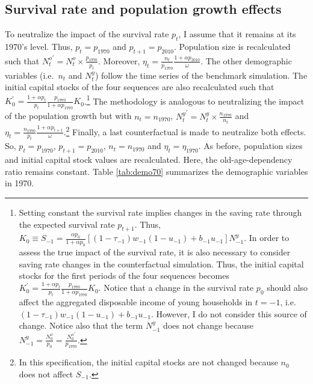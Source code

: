 \documentclass[
]{article}
\begin{document}
\hypertarget{srpg}{%
\subsection{Survival rate and population growth effects}\label{srpg}}

To neutralize the impact of the survival rate \(p_t\), I assume that it remains at its 1970's level. Thus, \(p_t = p_{1970}\) and \(p_{t+1} = p_{2010}\). Population size is recalculated such that \({N^o_t}^\prime = N_t^o\times\frac{p_{1970}}{p_t}\). Moreover, \(\eta_t = \frac{n_t}{p_{1970}}\frac{1+\alpha p_{2010}}{\omega}\).
The other demographic variables (i.e.~\(n_t\) and \(N^y_t\)) follow the time series of the benchmark simulation. The initial capital stocks of the four sequences are also recalculated such that \(K_0^\prime = \frac{1+\alpha p_t}{p_t}\frac{p_{1970}}{1+\alpha p_{1970}} K_0\).\footnote{Setting constant the survival rate implies changes in the saving rate through the expected survival rate \(p_{t+1}\). Thus, \(K_0 \equiv S_{-1} = \frac{\alpha p_0}{1+\alpha p_0}\left[(1-\tau_{-1})w_{-1}(1-u_{-1})+b_{-1}u_{-1}\right]N_{-1}^y\). In order to assess the true impact of the survival rate, it is also necessary to consider saving rate changes in the counterfactual simulation. Thus, the initial capital stocks for the first periods of the four sequences becomes \(K_0^\prime = \frac{1+\alpha p_t}{p_t}\frac{p_{1970}}{1+\alpha p_{1970}} K_0\). Notice that a change in the survival rate \(p_0\) should also affect the aggregated disposable income of young households in \(t=-1\), i.e.~\((1-\tau_{-1})w_{-1}(1-u_{-1})+b_{-1}u_{-1}\). However, I do not consider this source of change. Notice also that the term \(N_{-1}^y\) does not change because \(N_{-1}^y = \frac{N_0^o}{p_0} = \frac{{N_0^o}^\prime}{p_{1970}}\).} The methodology is analogous to neutralizing the impact of the population growth but with \(n_t = n_{1970}\), \({N_t^y}^\prime = N_t^y\times\frac{n_{1970}}{n_t}\) and \(\eta_t = \frac{n_{1970}}{p_t}\frac{1+\alpha p_{t+1}}{\omega}\).\footnote{In this specification, the initial capital stocks are not changed because \(n_0\) does not affect \(S_{-1}\).} Finally, a last counterfactual is made to neutralize both effects. So, \(p_t = p_{1970}\), \(p_{t+1} = p_{2010}\), \(n_t = n_{1970}\) and \(\eta_t = \eta_{1970}\). As before, population sizes and initial capital stock values are recalculated.
Here, the old-age-dependency ratio remains constant. Table \ref{tab:demo70} summarizes the demographic variables in 1970.
\end{document}
